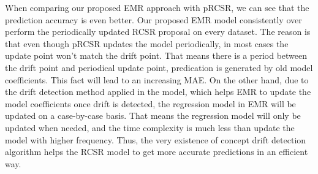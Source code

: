 \documentclass[conference,compsoc]{IEEEtran}
\begin{document}
When comparing our proposed EMR approach with pRCSR, we can see that the prediction accuracy is even better. Our proposed EMR model consistently over perform the periodically updated RCSR proposal on every dataset. The reason is that even though pRCSR updates the model periodically, in most cases the update point won't match the drift point. That means there is a period between the drift point and periodical update point, predication is generated by old model coefficients. This fact will lead to an increasing MAE. On the other hand, due to the drift detection method applied in the model, which helps EMR to update the model coefficients once drift is detected, the regression model in EMR will be updated on a case-by-case basis. That means the regression model will only be updated when needed, and the time complexity is much less than update the model with higher frequency. Thus, the very existence of concept drift detection algorithm helps the RCSR model to get more accurate predictions in an efficient way.

\end{document}
